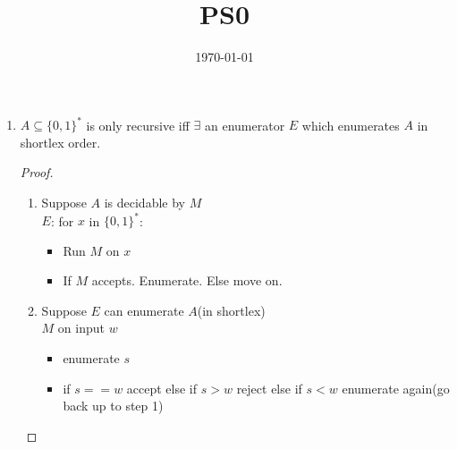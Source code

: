 \documentclass{article}
\title{PS0}
\date{\today}
\begin{document}
\maketitle
\begin{enumerate}[label=\alph*]
	\item $A \subseteq \{0,1\}^*$ is only recursive iff $\exists$ an enumerator $E$ which enumerates $A$ in shortlex order.
	\begin{proof}
	\begin{enumerate}[label=\roman*]
		\item Suppose $A$ is decidable by $M$\\
		$E$: for $x$ in $\{0,1\}^*$:
		\begin{itemize}
			\item Run $M$ on $x$
			\item If $M$ accepts. Enumerate. Else move on.
		\end{itemize}
		\checkmark
		\item Suppose $E$ can enumerate $A$(in shortlex)\\
		$M$ on input $w$
		\begin{itemize}
			\item enumerate $s$
			\item if $s == w$ accept
			else if $s>w$ reject
			else if $s<w$ enumerate again(go back up to step 1)
		\end{itemize}
	\end{enumerate}
	\end{proof}
\end{enumerate}
\end{document}
